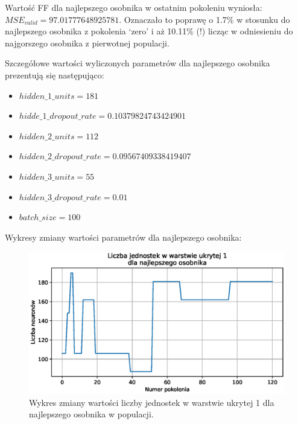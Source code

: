\documentclass[a4paper,12pt]{article}
\numberwithin{figure}{section}
\begin{document}
    \bigskip

    Wartość FF dla najlepszego osobnika w ostatnim pokoleniu wyniosła: \textbf{$MSE_{valid} = 97.01777648925781$}. Oznaczało to poprawę o 1.7\% w stosunku do najlepszego osobnika z pokolenia `zero' i aż 10.11\% (!) licząc w odniesieniu do najgorszego osobnika z pierwotnej populacji.

    \bigskip

    Szczegółowe wartości wyliczonych parametrów dla najlepszego osobnika prezentują się następująco:
    \begin{itemize}
        \item $hidden\_1\_units = 181$
        \item $hidde\_1\_dropout\_rate = 0.10379824743424901$
        \item $hidden\_2\_units = 112$
        \item $hidden\_2\_dropout\_rate = 0.09567409338419407$
        \item $hidden\_3\_units = 55$
        \item $hidden\_3\_dropout\_rate = 0.01$
        \item $batch\_size = 100$
    \end{itemize}

    \bigskip

    Wykresy zmiany wartości parametrów dla najlepszego osobnika:

    \bigskip

    \begin{figure}[H]
        \centering
        \includegraphics[width=\textwidth]{g_a_best_hidden_1_units}
        \caption{Wykres zmiany wartości liczby jednostek w warstwie ukrytej 1 dla najlepszego osobnika w populacji.}
        \label{fig:g_a_best_hidden_1_units}
    \end{figure}
\end{document}
